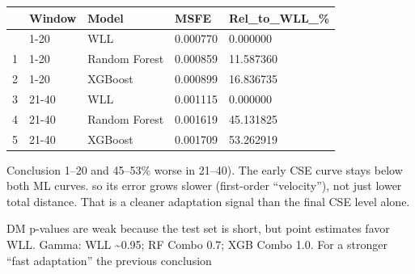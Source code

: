 \documentclass[
  letterpaper,
  DIV=11,
  numbers=noendperiod]{scrartcl}
\begin{document}
\begin{longtable}[]{@{}lllll@{}}
\toprule\noalign{}
& Window & Model & MSFE & Rel\_to\_WLL\_\% \\
\midrule\noalign{}
\endhead
\bottomrule\noalign{}
\endlastfoot
0 & 1-20 & WLL & 0.000770 & 0.000000 \\
1 & 1-20 & Random Forest & 0.000859 & 11.587360 \\
2 & 1-20 & XGBoost & 0.000899 & 16.836735 \\
3 & 21-40 & WLL & 0.001115 & 0.000000 \\
4 & 21-40 & Random Forest & 0.001619 & 45.131825 \\
5 & 21-40 & XGBoost & 0.001709 & 53.262919 \\
\end{longtable}

Conclusion 1--20 and 45--53\% worse in 21--40). The early CSE curve
stays below both ML curves. so its error grows slower (first-order
``velocity''), not just lower total distance. That is a cleaner
adaptation signal than the final CSE level alone.

DM p-values are weak because the test set is short, but point estimates
favor WLL. Gamma: WLL \textasciitilde0.95; RF Combo 0.7; XGB Combo 1.0.
For a stronger ``fast adaptation'' the previous conclusion
\end{document}
